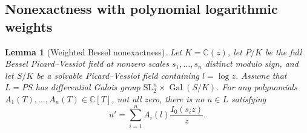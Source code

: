 \documentclass[11pt]{article}
\newtheorem{lemma}[theorem]{Lemma}
\theoremstyle{definition}
\theoremstyle{remark}
\begin{document}
\subsection{Nonexactness with polynomial logarithmic weights}

\begin{lemma}[Weighted Bessel nonexactness]\label{depth:nonexact}
Let $K=\mathbb C(z)$, let $P/K$ be the full Bessel Picard--Vessiot
field at nonzero scales $s_1,\ldots,s_n$ distinct modulo sign, and
let $S/K$ be a solvable Picard--Vessiot field containing
$l=\log z$.  Assume that $L=PS$ has differential Galois group
$\mathrm{SL}_2^n\times\operatorname{Gal}(S/K)$.
For any polynomials $A_1(T),\ldots,A_n(T)\in\mathbb C[T]$, not all
zero, there is no $u\in L$ satisfying
\begin{equation}\label{depth:weighted-derivative}
 u'=\sum_{i=1}^n A_i(l)\frac{I_0(s_i z)}z.
\end{equation}
\end{lemma}
\end{document}
